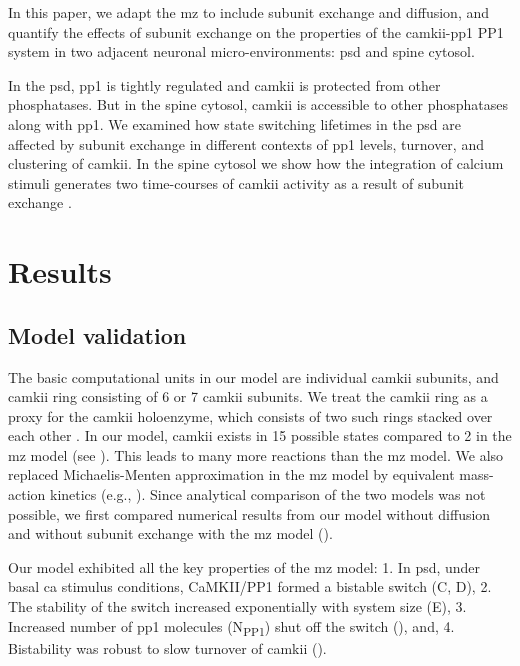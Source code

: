\documentclass[9pt,lineno,doublespacing]{elife}
\newcommand\SUB[2]{#1\textsubscript{#2}}
\begin{document}
In this paper, we adapt the \gls{mz} \citep{miller_stability_2005} to include
subunit exchange and diffusion, and quantify the effects of subunit exchange on
the properties of the \gls{camkii}-\gls{pp1} PP1 system in two adjacent neuronal
micro-environments: \gls{psd} and spine cytosol. 

In the \gls{psd}, \gls{pp1} is tightly regulated and \gls{camkii} is protected
from other phosphatases. But in the spine cytosol, \gls{camkii} is accessible to
other phosphatases along with \gls{pp1}. We examined how state switching
lifetimes in the \gls{psd} are affected by subunit exchange in different
contexts of \gls{pp1} levels, turnover, and clustering of \gls{camkii}. In the
spine cytosol we show how the integration of calcium stimuli generates two
time-courses of \gls{camkii} activity as a result of subunit exchange
\citep{chang_camkii_2017}.

\section{Results}\label{sec:results} 
\subsection{Model validation}\label{subsec:model-validation}
The basic computational units in our model are individual \gls{camkii} subunits,
and \gls{camkii} ring consisting of 6 or 7 \gls{camkii} subunits. We treat the
\gls{camkii} ring as a proxy for the \gls{camkii} holoenzyme, which consists of
two such rings stacked over each other
\citep{woodgett_calmodulin-dependent_1983,hoelz_crystal_2003,chao_mechanism_2011}. In
our model, \gls{camkii} exists in 15 possible states compared to 2 in the
\gls{mz} model (see ). This leads to many
more reactions than the \gls{mz} model. We also replaced Michaelis-Menten
approximation in the \gls{mz} model by equivalent mass-action kinetics (e.g.,
).  Since analytical comparison of the two models was not
possible, we first compared numerical results from our model without diffusion
and without subunit exchange with the \gls{mz} model ().

Our model exhibited all the key properties of the \gls{mz} model: 1. In
\gls{psd}, under basal \gls{ca} stimulus conditions, CaMKII/PP1 formed a
bistable switch (C, D), 2. The stability of the switch increased
exponentially with system size (E), 3. Increased number of
\gls{pp1} molecules (\SUB{N}{PP1}) shut off the switch (),
and, 4. Bistability was robust to slow turnover of \gls{camkii}
().
\end{document}
